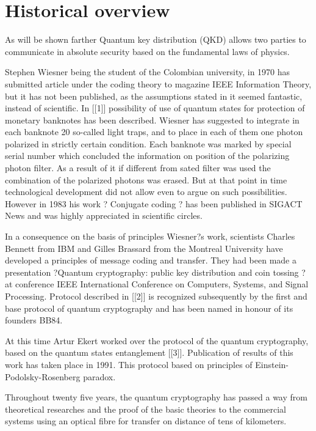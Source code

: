 \label{ch:Introduction}
 
\section{Historical overview}

As will be shown farther Quantum key distribution (QKD) allows two
parties to communicate in absolute security based on the fundamental
laws of physics.

Stephen Wiesner being the student of the Colombian university, in 1970
has submitted article under the coding theory to magazine IEEE
Information Theory, but it has not been published, as the assumptions
stated in it seemed fantastic, instead of scientific. In [[1]]
possibility of use of quantum states for protection of monetary
banknotes has been described. Wiesner has suggested to integrate in
each banknote 20 so-called light traps, and to place in each of them
one photon polarized in strictly certain condition. Each banknote was
marked by special serial number which concluded the information on
position of the polarizing photon filter. As a result of it if
different from sated filter was used the combination of the polarized
photons was erased. But at that point in time technological
development did not allow even to argue on such possibilities. However
in 1983 his work ? Conjugate coding ? has been published in SIGACT
News and was highly appreciated in scientific circles.

In a consequence on the basis of principles Wiesner?s work, scientists
Charles Bennett from IBM and Gilles Brassard from the Montreal
University have developed a principles of message coding and
transfer. They had been made a presentation ?Quantum cryptography:
public key distribution and coin tossing ? at conference IEEE
International Conference on Computers, Systems, and Signal
Processing. Protocol described in [[2]] is recognized subsequently by
the first and base protocol of quantum cryptography and has been named
in honour of its founders BB84.

At this time Artur Ekert worked over the protocol of the quantum
cryptography, based on the quantum states entanglement
[[3]]. Publication of results of this work has taken place in
1991. This protocol based on principles of Einstein-Podolsky-Rosenberg
paradox.

Throughout twenty five years, the quantum cryptography has passed a
way from theoretical researches and the proof of the basic theories to
the commercial systems using an optical fibre for transfer on distance
of tens of kilometers.

